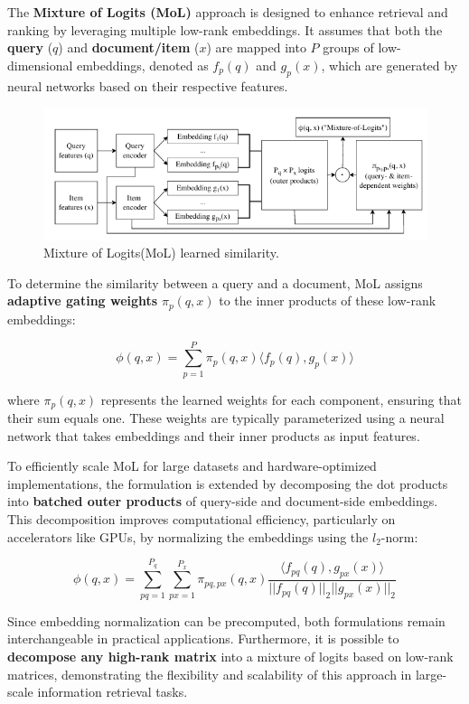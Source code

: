 The \textbf{Mixture of Logits (MoL)}\citep{zhai2023revisiting,Ding2024}  approach is designed to enhance retrieval and ranking by leveraging multiple low-rank embeddings. It assumes that both the \textbf{query} (\( q \)) and \textbf{document/item} (\( x \)) are mapped into \( P \) groups of low-dimensional embeddings, denoted as \( f_p(q) \) and \( g_p(x) \), which are generated by neural networks based on their respective features.
\begin{figure}[h]
	\centering
	\includegraphics[width=0.7\linewidth]{Figures/mol.png}
	\caption{Mixture of Logits(MoL) learned similarity.}
	\label{Mixture_of_Logits }	
\end{figure}
To determine the similarity between a query and a document, MoL assigns \textbf{adaptive gating weights} \( \pi_p(q,x) \) to the inner products of these low-rank embeddings\citep{zhai2023revisiting}:

\begin{equation}
	\phi(q,x) = \sum_{p=1}^{P} \pi_p(q,x) \langle f_p(q), g_p(x) \rangle
\end{equation}

where \( \pi_p(q,x) \) represents the learned weights for each component, ensuring that their sum equals one. These weights are typically parameterized using a neural network that takes embeddings and their inner products as input features.

To efficiently scale MoL for large datasets and hardware-optimized implementations, the formulation is extended by decomposing the dot products into \textbf{batched outer products} of query-side and document-side embeddings. This decomposition improves computational efficiency, particularly on accelerators like GPUs, by normalizing the embeddings using the \( l_2 \)-norm:\citep{zhai2023revisiting}

\begin{equation}
	\phi(q,x) = \sum_{pq=1}^{P_q} \sum_{px=1}^{P_x} \pi_{pq,px}(q,x) \frac{\langle f_{pq}(q), g_{px}(x) \rangle}{|| f_{pq}(q) ||_2 || g_{px}(x) ||_2}
\end{equation}

Since embedding normalization can be precomputed, both formulations remain interchangeable in practical applications. Furthermore, it is possible to \textbf{decompose any high-rank matrix} into a mixture of logits based on low-rank matrices, demonstrating the flexibility and scalability of this approach in large-scale information retrieval tasks.
